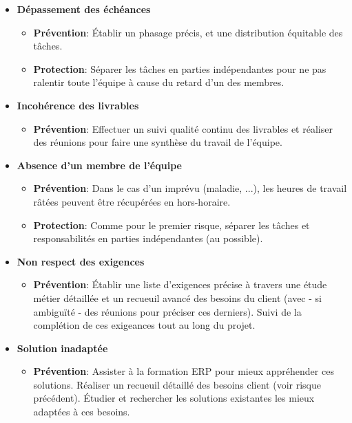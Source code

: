 \begin{itemize}

  \item \textbf{Dépassement des échéances}
        \begin{itemize}
          \item \textbf{Prévention}: Établir un phasage précis, et une distribution équitable des tâches.
          \item \textbf{Protection}: Séparer les tâches en parties indépendantes pour ne pas ralentir toute l'équipe à cause du retard d'un des membres.
        \end{itemize}

  \item \textbf{Incohérence des livrables}
        \begin{itemize}
          \item \textbf{Prévention}: Effectuer un suivi qualité continu des livrables et réaliser des réunions pour faire une synthèse du travail de l'équipe.
        \end{itemize}

  \item \textbf{Absence d'un membre de l'équipe}
        \begin{itemize}
          \item \textbf{Prévention}: Dans le cas d'un imprévu (maladie, ...), les heures de travail râtées peuvent être récupérées en hors-horaire.
          \item \textbf{Protection}: Comme pour le premier risque, séparer les tâches et responsabilités en parties indépendantes (au possible).
        \end{itemize}


  \item \textbf{Non respect des exigences}
        \begin{itemize}
          \item \textbf{Prévention}: Établir une liste d'exigences précise à travers une étude métier détaillée et un recueuil avancé des besoins du client (avec - si ambiguïté - des réunions pour préciser ces derniers). Suivi de la complétion de ces exigeances tout au long du projet.
        \end{itemize}


  \item \textbf{Solution inadaptée}
        \begin{itemize}
          \item \textbf{Prévention}:  Assister à la formation ERP pour mieux appréhender ces solutions. Réaliser un recueuil détaillé des besoins client (voir risque précédent). Étudier et rechercher les solutions existantes les mieux adaptées à ces besoins.
        \end{itemize}



\end{itemize}
